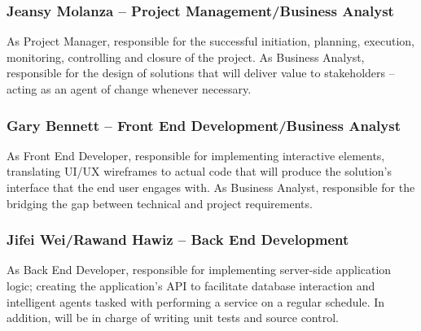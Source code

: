 \subsubsection{Jeansy Molanza -- Project Management/Business Analyst}

As Project Manager, responsible for the successful initiation, planning, execution, monitoring, controlling and closure of the project. As Business Analyst, responsible for the design of solutions that will deliver value to stakeholders -- acting as an agent of change whenever necessary.

\subsubsection{Gary Bennett -- Front End Development/Business Analyst}

As Front End Developer, responsible for implementing interactive elements, translating UI/UX wireframes to actual code that will produce the solution's interface that the end user engages with. As Business Analyst, responsible for the bridging the gap between technical and project requirements.

\subsubsection{Jifei Wei/Rawand Hawiz -- Back End Development}

As Back End Developer, responsible for implementing server-side application logic; creating the application's API to facilitate database interaction and intelligent agents tasked with performing a service on a regular schedule. In addition, will be in charge of writing unit tests and source control.
